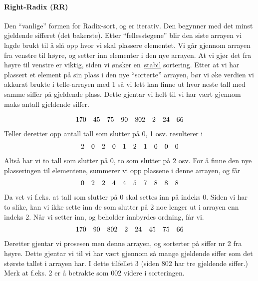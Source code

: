 \paragraph{Right-Radix (RR)}
Den ``vanlige'' formen for Radix-sort, og er iterativ.
Den begynner med det minst gjeldende sifferet (det bakerste). Etter
``fellesstegene'' blir den siste arrayen vi lagde brukt til å slå opp hvor vi
skal plassere elementet. Vi går gjennom arrayen fra venstre til høyre, og setter
inn elementer i den nye arrayen. At vi gjør det fra høyre til venstre er viktig,
siden vi ønsker en~\hyperref[stabil]{stabil} sortering. Etter at vi har plassert
et element på sin plass i den nye ``sorterte'' arrayen, bør vi øke verdien vi
akkurat brukte i telle-arrayen med 1 så vi lett kan finne ut hvor neste tall med
samme siffer på gjeldende plass. Dette gjentar vi helt til vi har vært gjennom
maks antall gjeldende siffer.

\begin{eks}
  \begin{displaymath}
    \begin{array}{c c c c c c c c}
      170&45&75&90&802&2&24&66
    \end{array}
  \end{displaymath}
  Teller deretter opp antall tall som slutter på 0, 1 osv. resulterer i
  \begin{displaymath}
    \begin{array}{c c c c c c c c c c}
      2&0&2&0&1&2&1&0&0&0
    \end{array}
  \end{displaymath}
  Altså har vi to tall som slutter på 0, to som slutter på 2 osv. For å finne
  den nye plasseringen til elementene, summerer vi opp plassene i denne arrayen,
  og får
  \begin{displaymath}
    \begin{array}{c c c c c c c c c c}
      0&2&2&4&4&5&7&8&8&8
    \end{array}
  \end{displaymath}
  Da vet vi f.eks. at tall som slutter på 0 skal settes inn på indeks 0. Siden
  vi har to slike, kan vi ikke sette inn de som slutter på 2 noe lenger ut i
  arrayen enn indeks 2. Når vi setter inn, og beholder innbyrdes ordning, får
  vi.
  \begin{displaymath}
    \begin{array}{c c c c c c c c}
      170&90&802&2&24&45&75&66
    \end{array}
  \end{displaymath}
  Deretter gjentar vi prosesen men denne arrayen, og sorterter på siffer nr 2
  fra høyre. Dette gjentar vi til vi har vært gjennom så mange gjeldende siffer
  som det største tallet i arrayen har. I dette tilfellet 3 (siden 802 har tre
  gjeldende siffer.) Merk at f.eks. 2 er å betrakte som 002 videre i sorteringen.
\end{eks}

